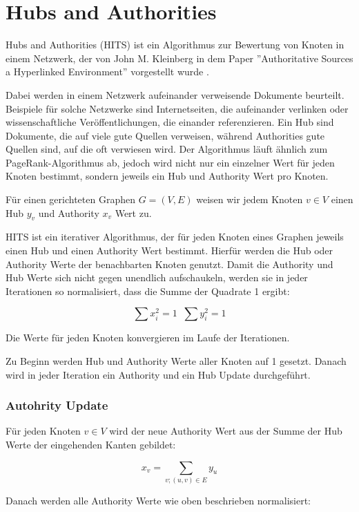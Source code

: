 \section{Hubs and Authorities}
\label{hits}

Hubs and Authorities (HITS) ist ein Algorithmus zur Bewertung von Knoten in einem Netzwerk, der von John M. Kleinberg in dem Paper ''Authoritative Sources a Hyperlinked Environment'' vorgestellt wurde \cite{Kleinberg98authoritativesources}.

Dabei werden in einem Netzwerk aufeinander verweisende Dokumente beurteilt. Beispiele für solche Netzwerke sind Internetseiten, die aufeinander
verlinken oder wissenschaftliche Veröffentlichungen, die einander referenzieren. Ein Hub sind Dokumente, die auf viele gute Quellen verweisen, während
Authorities gute Quellen sind, auf die oft verwiesen wird. Der Algorithmus läuft ähnlich zum PageRank-Algorithmus ab, 
jedoch wird nicht nur ein einzelner Wert für jeden Knoten bestimmt, sondern jeweils ein Hub und Authority Wert pro Knoten.

Für einen gerichteten Graphen $G = (V, E)$ weisen wir jedem Knoten $v \in V$ einen Hub $y_{v}$ und Authority $x_{v}$ Wert zu.

HITS ist ein iterativer Algorithmus, der für jeden Knoten eines Graphen jeweils einen Hub und einen Authority Wert bestimmt. Hierfür 
werden die Hub oder Authority Werte der benachbarten Knoten genutzt. Damit die Authority und Hub Werte sich nicht gegen
unendlich aufschaukeln, werden sie in jeder Iterationen so normalisiert, dass die Summe der Quadrate 1 ergibt:

\[ \sum x_{i}^{2} = 1 \; \; \sum y_{i}^{2} = 1 \]

Die Werte für jeden Knoten konvergieren im Laufe der Iterationen.

Zu Beginn werden Hub und Authority Werte aller Knoten auf 1 gesetzt. Danach wird in jeder Iteration ein Authority und ein Hub Update durchgeführt.
\subsubsection{Autohrity Update}

Für jeden Knoten $ v \in V $ wird der neue Authority Wert aus der Summe der Hub Werte der eingehenden Kanten gebildet:

\[ x_{v} = \sum_{v; (u, v) \in E} y_{u} \]

Danach werden alle Authority Werte wie oben beschrieben normalisiert:

